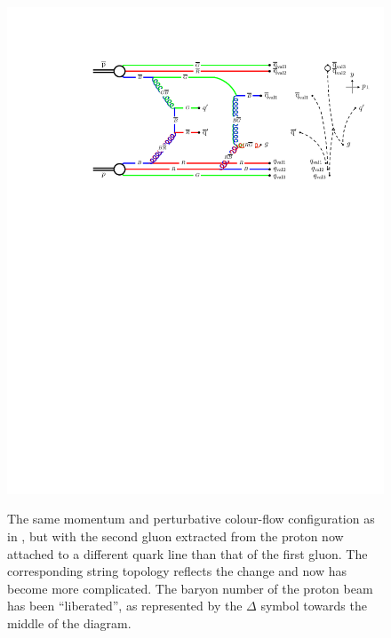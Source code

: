 \begin{figure}
\begin{center}\vspace*{2mm}%
\hspace*{-1mm}\includegraphics*[scale=0.7]{minim-bias/mb-col2}\\
\caption{The same momentum and perturbative colour-flow
configuration as in , but with the second gluon
extracted from the proton now attached to a different quark line than
that of the first gluon. The corresponding string topology reflects
the change and now has become more complicated.
 The baryon number of the proton beam has been ``liberated'', as represented by
  the $\Delta$ symbol towards the middle of the diagram.
\label{fig:justring2}}
\end{center}
\end{figure}


